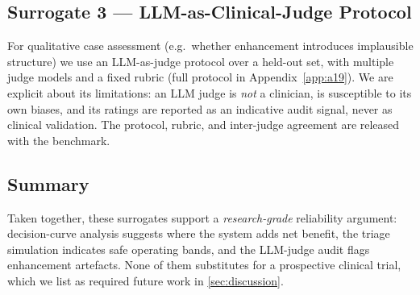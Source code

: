 \subsection{Surrogate 3 --- LLM-as-Clinical-Judge Protocol}\label{app:a23-llm}
For qualitative case assessment (e.g.\ whether enhancement introduces implausible structure) we use
an LLM-as-judge protocol over a held-out set, with multiple judge models and a fixed rubric (full
protocol in Appendix~\ref{app:a19}). We are
explicit about its limitations: an LLM judge is \emph{not} a clinician, is susceptible to its own
biases, and its ratings are reported as an indicative audit signal, never as clinical validation. The
protocol, rubric, and inter-judge agreement are released with the benchmark.

\subsection{Summary}\label{app:a23-summary}
Taken together, these surrogates support a \emph{research-grade} reliability argument: decision-curve
analysis suggests where the system adds net benefit, the triage simulation indicates safe operating
bands, and the LLM-judge audit flags enhancement artefacts. None of them substitutes for a
prospective clinical trial, which we list as required future work in \cref{sec:discussion}.
